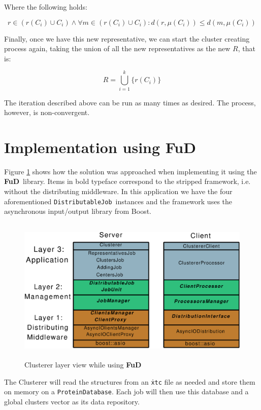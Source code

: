\documentclass[a4paper,12pt,english]{report}
\newcommand{\fud}{\textbf{FuD}}
\renewcommand{\DJ}{\texttt{DistributableJob}}
\begin{document}
Where the following holds:

$$r \in (r(C_i) \cup C_i) \wedge \forall m \in (r(C_i)\cup C_i) : d(r,\mu(C_i)) \leq d(m,\mu(C_i))$$

Finally, once we have this new representative, we can start the cluster creating process again, taking the union of all the new representatives as the new $R$, that is:

$$R = \bigcup_{i=1}^{k} \{r(C_i)\}$$

The iteration described above can be run as many times as desired. The process, however, is non-convergent.

\section{Implementation using \fud}

Figure \ref{conlayers} shows how the solution was approached when implementing it using the \fud \ library. Items in bold typeface correspond to the stripped framework, i.e. without the distributing middleware. In this application we have the four aforementioned \DJ \ instances and the framework uses the asynchronous input/output library from Boost.

\begin{figure}[!ht]
\begin{center}
\includegraphics [height=7cm]{images/ClustererLayers.eps}
\end{center}
\caption{Clusterer layer view while using \fud}
\label{conlayers}
\end{figure}

The Clusterer will read the structures from an \texttt{\.xtc} file as needed and store them on memory on a \texttt{ProteinDatabase}. Each job will then use this database and a global clusters vector as its data repository.
\end{document}
